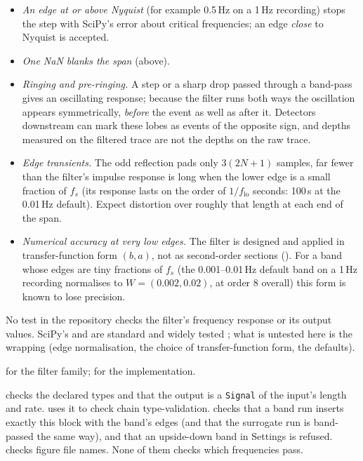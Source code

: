 \begin{itemize}
\item \emph{An edge at or above Nyquist} (for example 0.5\,Hz on a 1\,Hz recording) stops the
  step with SciPy's error about critical frequencies; an edge \emph{close} to Nyquist is
  accepted.
\item \emph{One NaN blanks the span} (above).
\item \emph{Ringing and pre-ringing.} A step or a sharp drop passed through a band-pass gives
  an oscillating response; because the filter runs both ways the oscillation appears
  symmetrically, \emph{before} the event as well as after it. Detectors downstream can mark
  these lobes as events of the opposite sign, and depths measured on the filtered trace are not
  the depths on the raw trace.
\item \emph{Edge transients.} The odd reflection pads only $3(2N+1)$ samples, far fewer than
  the filter's impulse response is long when the lower edge is a small fraction of $f_s$ (its
  response lasts on the order of $1/f_\mathrm{lo}$ seconds: 100\,s at the 0.01\,Hz default).
  Expect distortion over roughly that length at each end of the span.
\item \emph{Numerical accuracy at very low edges.} The filter is designed and applied in
  transfer-function form $(b, a)$, not as second-order sections (). For a
  band whose edges are tiny fractions of $f_s$ (the 0.001--0.01\,Hz default band on a 1\,Hz
  recording normalises to $W = (0.002, 0.02)$, at order 8 overall) this form is known to lose
  precision. 
\end{itemize}

No test in the repository checks the filter's frequency response or its output values.
SciPy's  and  are standard and widely tested
\citep{virtanen2020scipy}; what is untested here is the wrapping (edge normalisation, the
choice of transfer-function form, the defaults).

\citet{butterworth1930theory} for the filter family; \citet{virtanen2020scipy} for the
implementation.

 checks the declared types and that the output is a
\texttt{Signal} of the input's length and rate.  uses it
to check chain type-validation.  checks that a band run inserts
exactly this block with the band's edges (and that the surrogate run is band-passed the same
way), and that an upside-down band in Settings is refused. 
checks figure file names. None of them checks which frequencies pass.
